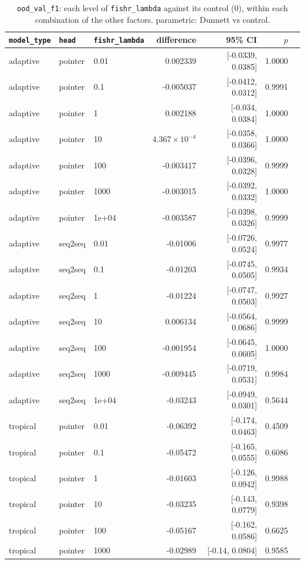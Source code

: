 \documentclass[10pt]{article}
\begin{document}
{\small
\begin{longtable}{lllrrrl}
\caption{\texttt{ood\_val\_f1}: each level of \texttt{fishr\_lambda} against its control (0), within each combination of the other factors. parametric: Dunnett vs control.}\label{tab:control-ood_val_f1}\\
\toprule
\texttt{model\_type} & \texttt{head} & \texttt{fishr\_lambda} & difference & 95\% CI & $p$ & \\
\midrule
\endhead
adaptive & pointer & 0.01 & 0.002339 & [-0.0339, 0.0385] & 1.0000 & \\
adaptive & pointer & 0.1 & -0.005037 & [-0.0412, 0.0312] & 0.9991 & \\
adaptive & pointer & 1 & 0.002188 & [-0.034, 0.0384] & 1.0000 & \\
adaptive & pointer & 10 & $4.367\times10^{-4}$ & [-0.0358, 0.0366] & 1.0000 & \\
adaptive & pointer & 100 & -0.003417 & [-0.0396, 0.0328] & 0.9999 & \\
adaptive & pointer & 1000 & -0.003015 & [-0.0392, 0.0332] & 1.0000 & \\
adaptive & pointer & 1e+04 & -0.003587 & [-0.0398, 0.0326] & 0.9999 & \\
adaptive & seq2seq & 0.01 & -0.01006 & [-0.0726, 0.0524] & 0.9977 & \\
adaptive & seq2seq & 0.1 & -0.01203 & [-0.0745, 0.0505] & 0.9934 & \\
adaptive & seq2seq & 1 & -0.01224 & [-0.0747, 0.0503] & 0.9927 & \\
adaptive & seq2seq & 10 & 0.006134 & [-0.0564, 0.0686] & 0.9999 & \\
adaptive & seq2seq & 100 & -0.001954 & [-0.0645, 0.0605] & 1.0000 & \\
adaptive & seq2seq & 1000 & -0.009445 & [-0.0719, 0.0531] & 0.9984 & \\
adaptive & seq2seq & 1e+04 & -0.03243 & [-0.0949, 0.0301] & 0.5644 & \\
tropical & pointer & 0.01 & -0.06392 & [-0.174, 0.0463] & 0.4509 & \\
tropical & pointer & 0.1 & -0.05472 & [-0.165, 0.0555] & 0.6086 & \\
tropical & pointer & 1 & -0.01603 & [-0.126, 0.0942] & 0.9988 & \\
tropical & pointer & 10 & -0.03235 & [-0.143, 0.0779] & 0.9398 & \\
tropical & pointer & 100 & -0.05167 & [-0.162, 0.0586] & 0.6625 & \\
tropical & pointer & 1000 & -0.02989 & [-0.14, 0.0804] & 0.9585 & \\

\end{longtable}}
\end{document}
